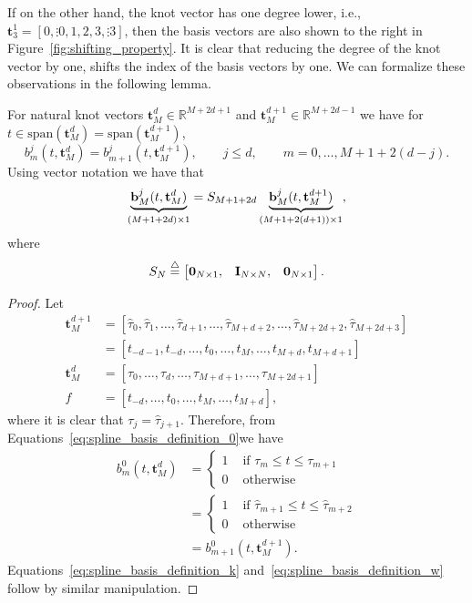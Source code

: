 If on the other hand, the knot vector has one degree lower, i.e., $\mathbf{t}_3^1 = [0,\vdots 0, 1, 2, 3, \vdots 3]$, then the basis vectors are also shown to the right in Figure~\ref{fig:shifting_property}.  It is clear that reducing the degree of the knot vector by one, shifts the index of the basis vectors by one.  We can formalize these observations in the following lemma.
\begin{lemma} \label{lem:shifting_property}
For natural knot vectors $\mathbf{t}_M^d \in \mathbb{R}^{M+2d+1}$ and $\mathbf{t}_M^{d+1}\in\mathbb{R}^{M+2d-1}$ we have for $t\in\text{span}(\mathbf{t}_M^d)=\text{span}(\mathbf{t}_M^{d+1})$,
\[
b_m^j(t,  \mathbf{t}_M^d) = b_{m+1}^j(t,  \mathbf{t}_M^{d+1}), \qquad j \leq d, \qquad m = 0, \dots, M+1+2(d-j).
\]	
Using vector notation we have that
\[
\underbrace{\mathbf{b}_M^{j}(t,  \mathbf{t}_M^{d})}_{(M+1+2d)\times 1} = S_{M+1+2d} \underbrace{\mathbf{b}_M^{j}(t,  \mathbf{t}_M^{d+1})}_{(M+1+2(d+1))\times 1},
\]
where
\[
	S_{N} \stackrel{\triangle}{=} \begin{bmatrix} \mathbf{0}_{N\times 1}, & \mathbf{I}_{N\times N}, & \mathbf{0}_{N\times 1} \end{bmatrix}.
\]
\end{lemma}
\begin{proof}
Let
\begin{align*}
\mathbf{t}_M^{d+1} &= [\hat{\tau}_{0}, \hat{\tau}_{1}, \dots, \hat{\tau}_{d+1}, \dots, \hat{\tau}_{M+d+2}, \dots, \hat{\tau}_{M+2d+2}, \hat{\tau}_{M+2d+3}] \\
				   &= [t_{-d-1}, t_{-d}, \dots, t_{0}, \dots, t_M, \dots, t_{M+d}, t_{M+d+1}] \\
\mathbf{t}_M^{d}   &= [\tau_{0}, \dots, \tau_{d}, \dots, \tau_{M+d+1}, \dots, \tau_{M+2d+1}] \\f
				   &= [t_{-d}, \dots, t_{0}, \dots, t_M, \dots, t_{M+d}],
\end{align*}	
where it is clear that $\tau_j = \hat{\tau}_{j+1}$.  Therefore, from Equations~\eqref{eq:spline_basis_definition_0}we have
\begin{align*}
b_m^0(t, \mathbf{t}_M^d) &= \begin{cases} 1 & \text{~if~} \tau_m \leq t \leq \tau_{m+1} \\ 
 									 0 & \text{~otherwise} 
 					   		\end{cases} \\
 					   	 &= \begin{cases} 1 & \text{~if~} \hat{\tau}_{m+1} \leq t \leq \hat{\tau}_{m+2} \\ 
 									 0 & \text{~otherwise} 
 					   		\end{cases} \\
 					   	 &= b_{m+1}^0(t, \mathbf{t}_M^{d+1}). 
\end{align*}
Equations~\eqref{eq:spline_basis_definition_k} and~\eqref{eq:spline_basis_definition_w} follow by similar manipulation. 
\end{proof}


